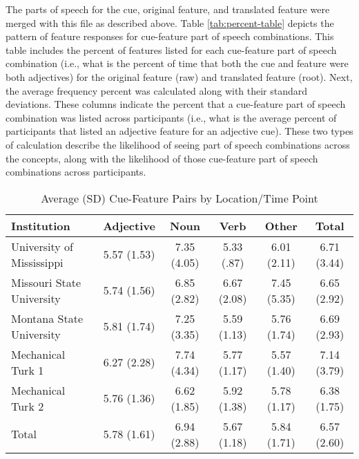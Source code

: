\documentclass[english,,man]{apa6}
\theoremstyle{definition}
\theoremstyle{definition}
\theoremstyle{definition}
\theoremstyle{remark}
\begin{document}
The parts of speech for the cue, original feature, and translated
feature were merged with this file as described above. Table
\ref{tab:percent-table} depicts the pattern of feature responses for
cue-feature part of speech combinations. This table includes the percent
of features listed for each cue-feature part of speech combination
(i.e., what is the percent of time that both the cue and feature were
both adjectives) for the original feature (raw) and translated feature
(root). Next, the average frequency percent was calculated along with
their standard deviations. These columns indicate the percent that a
cue-feature part of speech combination was listed across participants
(i.e., what is the average percent of participants that listed an
adjective feature for an adjective cue). These two types of calculation
describe the likelihood of seeing part of speech combinations across the
concepts, along with the likelihood of those cue-feature part of speech
combinations across participants.

\begin{table}[tbp]
\begin{center}
\begin{threeparttable}
\caption{\label{tab:feature-table}Average (SD) Cue-Feature Pairs by Location/Time Point}
\begin{tabular}{lccccc}
\toprule
Institution & Adjective & Noun & Verb & Other & Total\\
\midrule
University of Mississippi & 5.57 (1.53) & 7.35 (4.05) & 5.33 (.87) & 6.01 (2.11) & 6.71 (3.44)\\
Missouri State University & 5.74 (1.56) & 6.85 (2.82) & 6.67 (2.08) & 7.45 (5.35) & 6.65 (2.92)\\
Montana State University & 5.81 (1.74) & 7.25 (3.35) & 5.59 (1.13) & 5.76 (1.74) & 6.69 (2.93)\\
Mechanical Turk 1 & 6.27 (2.28) & 7.74 (4.34) & 5.77 (1.17) & 5.57 (1.40) & 7.14 (3.79)\\
Mechanical Turk 2 & 5.76 (1.36) & 6.62 (1.85) & 5.92 (1.38) & 5.78 (1.17) & 6.38 (1.75)\\
Total & 5.78 (1.61) & 6.94 (2.88) & 5.67 (1.18) & 5.84 (1.71) & 6.57 (2.60)\\
\bottomrule
\end{tabular}
\end{threeparttable}
\end{center}
\end{table}
\end{document}
